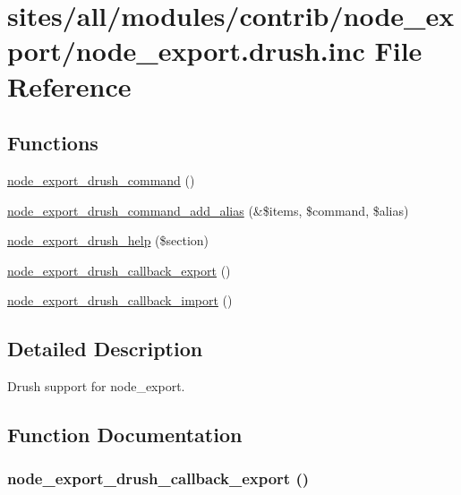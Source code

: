\hypertarget{node__export_8drush_8inc}{
\section{sites/all/modules/contrib/node\_\-export/node\_\-export.drush.inc File Reference}
\label{node__export_8drush_8inc}
}
\subsection*{Functions}
\begin{CompactItemize}
\item 
\hyperlink{node__export_8drush_8inc_d0e489b683728b0c274b44cf5f4b034c}{node\_\-export\_\-drush\_\-command} ()
\item 
\hyperlink{node__export_8drush_8inc_eb6d0dec8da62bc765d79f70c2e7a455}{node\_\-export\_\-drush\_\-command\_\-add\_\-alias} (\&\$items, \$command, \$alias)
\item 
\hyperlink{node__export_8drush_8inc_0724e4b804b130347ce440da8d774b59}{node\_\-export\_\-drush\_\-help} (\$section)
\item 
\hyperlink{node__export_8drush_8inc_c4b07c5ee7f10a9be169851831c5d205}{node\_\-export\_\-drush\_\-callback\_\-export} ()
\item 
\hyperlink{node__export_8drush_8inc_7c89938876342be015d3cc7ee5de8017}{node\_\-export\_\-drush\_\-callback\_\-import} ()
\end{CompactItemize}


\subsection{Detailed Description}
Drush support for node\_\-export. 

\subsection{Function Documentation}
\hypertarget{node__export_8drush_8inc_c4b07c5ee7f10a9be169851831c5d205}{
\subsubsection[{node\_\-export\_\-drush\_\-callback\_\-export}]{\setlength{\rightskip}{0pt plus 5cm}node\_\-export\_\-drush\_\-callback\_\-export ()}}
\label{node__export_8drush_8inc_c4b07c5ee7f10a9be169851831c5d205}



